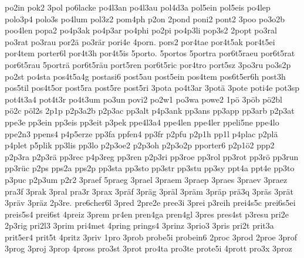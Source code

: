 {    po2in
    pok2
    3pol
    po6lacke
    po4l3an
    po4l3au
    pol4d3a
    pol5ein
    pol5eis
    po4lep
    polo3p4
    polo3s
    po4lum
    pol3z2
    pom4ph
    p2on
    2pond
    poni2
    pont2
    3poo
    po3o2b
    poo4len
    popa2
    po4p3ak
    po4p3ar
    po4phi
    po2pi
    po4p3li
    pop3s2
    2popt
    po3ral
    po3rat
    po3rau
    por2ä
    po3rär
    pori4e
    4porn.
    pors2
    por4tae
    por4t5ak
    por4t5ei
    por4tem
    porter6l
    por4t3h
    por4t5is
    5porto.
    5portos
    5portra
    por6t5raeu
    por6t5rat
    por6t5rau
    5porträ
    por6t5räu
    port5ren
    por6t5ric
    por4tro
    port5sz
    3po3ru
    po3s2p
    po2st
    po4sta
    pos4t5a4g
    postasi6
    post5au
    post5ein
    pos4tem
    pos6t5er6h
    post3h
    pos5til
    pos4t5or
    post5ra
    post5re
    post5ri
    3pota
    po4t3ar
    3potä
    3pote
    poti4e
    pot3sp
    pot4t3a4
    pot4t3r
    po4t3um
    po3un
    povi2
    po2w1
    po3wa
    powe2
    1pö
    3pöb
    pö2bl
    pö2c
    pöl2s
    2p1p
    p2p3a2b
    p2p3ac
    pp3alt
    p4p3ank
    pp3ans
    pp3app
    pp3arb
    p2p3at
    ppe3e
    pp3ein
    pp3eis
    pp3eit
    p3pek
    ppe4l3a4
    ppe4len
    ppe4ler
    ppeli5ne
    ppe4lo
    ppe2n3
    ppens4
    p4p5erze
    pp3fa
    ppfen4
    pp3fr
    p2pfu
    p2p1h
    pp1l
    p4plac
    p2plä
    p4plet
    p5plik
    pp3lis
    pp3lo
    p2p3oe2
    p2p3oh
    p2p3o2p
    pporter6
    p2p1ö2
    ppp2
    p2p3ra
    p2p3rä
    pp3rec
    p4p3reg
    pp3ren
    p2p3ri
    pp3roe
    pp3rol
    pp3rot
    pp3rö
    pp3run
    pp3rüc
    p2ps
    pps2a
    pps2p
    pp3sta
    pp3sto
    pp3str
    pp3stu
    pp3sy
    ppt4a
    ppt4e
    pp3to
    p3puc
    p2p3um
    p2r2
    3praef
    5praeg
    3prael
    3praem
    3praep
    3praes
    3praev
    3praez
    pra3f
    3prak
    3pral
    pra3r
    3prax
    3präf
    3präg
    3präl
    3präm
    3präp
    prä3q
    3präs
    3prät
    3präv
    3präz
    2p3re.
    pre6cher6l
    3pred
    2pre2e
    pree3i
    3prei
    p3reih
    prei4s5c
    prei6s5ei
    preis5s4
    prei6st
    4preiz
    3prem
    pr4en
    pren4ga
    pren4gl
    3pres
    pres4st
    p3resu
    pri2e
    2p3rig
    pri2l3
    3prim
    pri4met
    4pring
    prings4
    3prinz
    3prio3
    3pris
    pri2t
    prit3a
    prit5er4
    prit5t
    4pritz
    3priv
    1pro
    3prob
    probe5i
    probein6
    2proc
    3prod
    2proe
    3prof
    3prog
    3proj
    3prop
    4pross
    pro3st
    3prot
    pro4ta
    pro3te
    prote5i
    4prott
    pro3x
    3proz
}
